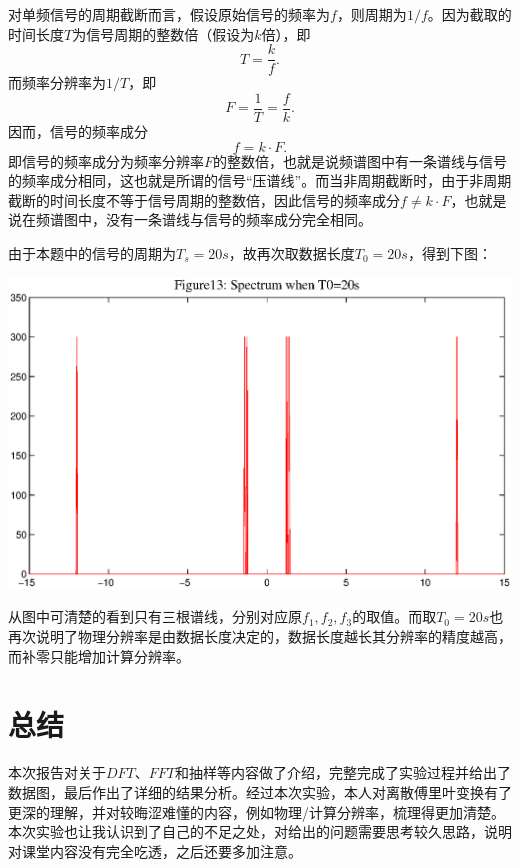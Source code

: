 \documentclass[a4paper,11pt,onecolumn,twoside]{article}
\begin{document}
对单频信号的周期截断而言，假设原始信号的频率为$f$，则周期为$1/f$。因为截取的时间长度$T$为信号周期的整数倍（假设为$k$倍），即
\begin{equation*}
T = \frac{k}{f}.
\end{equation*}
而频率分辨率为$1/T$，即
\begin{equation*}
F = \frac{1}{T} = \frac{f}{k}.
\end{equation*}
因而，信号的频率成分
\begin{equation*}
f = k \cdot F.
\end{equation*}
即信号的频率成分为频率分辨率$F$的整数倍，也就是说频谱图中有一条谱线与信号的频率成分相同，这也就是所谓的信号``压谱线''。而当非周期截断时，由于非周期截断的时间长度不等于信号周期的整数倍，因此信号的频率成分$f \neq k \cdot F$，也就是说在频谱图中，没有一条谱线与信号的频率成分完全相同。

由于本题中的信号的周期为$T_s=20s$，故再次取数据长度$T_0=20s$，得到下图：
\begin{center}
    \includegraphics[width=1\textwidth]{fig13.eps}
\end{center}
从图中可清楚的看到只有三根谱线，分别对应原$f_1,f_2,f_3$的取值。而取$T_0=20s$也再次说明了物理分辨率是由数据长度决定的，数据长度越长其分辨率的精度越高，而补零只能增加计算分辨率。

\section{总结}

本次报告对关于$DFT$、$FFT$和抽样等内容做了介绍，完整完成了实验过程并给出了数据图，最后作出了详细的结果分析。经过本次实验，本人对离散傅里叶变换有了更深的理解，并对较晦涩难懂的内容，例如物理/计算分辨率，梳理得更加清楚。本次实验也让我认识到了自己的不足之处，对给出的问题需要思考较久思路，说明对课堂内容没有完全吃透，之后还要多加注意。
\end{document}
